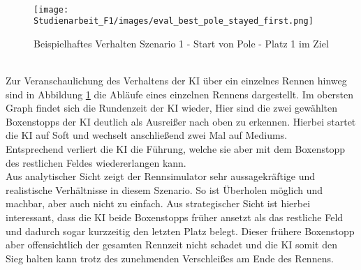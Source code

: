 \\
\begin{figure}
    \texttt{[image: Studienarbeit\_F1/images/eval\_best\_pole\_stayed\_first.png]}
    \caption{Beispielhaftes Verhalten Szenario 1 - Start von Pole - Platz 1 im Ziel}
    \label{fig:example_scenario_one}
\end{figure}
\\
Zur Veranschaulichung des Verhaltens der KI über ein einzelnes Rennen hinweg sind in Abbildung \ref{fig:example_scenario_one} die Abläufe eines einzelnen Rennens dargestellt. Im obersten Graph findet sich die Rundenzeit der KI wieder, Hier sind die zwei gewählten Boxenstopps der KI deutlich als Ausreißer nach oben zu erkennen. Hierbei startet die KI auf Soft und wechselt anschließend zwei Mal auf Mediums.\\
Entsprechend verliert die KI die Führung, welche sie aber mit dem Boxenstopp des restlichen Feldes wiedererlangen kann.\\
Aus analytischer Sicht zeigt der Rennsimulator sehr aussagekräftige und realistische Verhältnisse in diesem Szenario. So ist Überholen möglich und machbar, aber auch nicht zu einfach. Aus strategischer Sicht ist hierbei interessant, dass die KI beide Boxenstopps früher ansetzt als das restliche Feld und dadurch sogar kurzzeitig den letzten Platz belegt. Dieser frühere Boxenstopp aber offensichtlich der gesamten Rennzeit nicht schadet und die KI somit den Sieg halten kann trotz des zunehmenden Verschleißes am Ende des Rennens.

